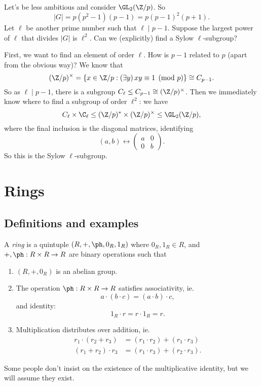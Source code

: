 \documentclass[a4paper]{article}
\begin{document}
\begin{eg}
  Let's be less ambitious and consider $\GL_2(\Z/p)$. So
  \[
    |G| = p(p^2 - 1)(p - 1) = p(p - 1)^2 (p + 1).
  \]
  Let $\ell$ be another prime number such that $\ell \mid p - 1$. Suppose the largest power of $\ell$ that divides $|G|$ is $\ell^2$. Can we (explicitly) find a Sylow $\ell$-subgroup?

  First, we want to find an element of order $\ell$. How is $p - 1$ related to $p$ (apart from the obvious way)? We know that
  \[
    (\Z/p)^\times = \{x \in \Z/p:(\exists y)\, xy \equiv 1 \pmod p\} \cong C_{p - 1}.
  \]
  So as $\ell\mid p - 1$, there is a subgroup $C_\ell \leq C_{p - 1} \cong (\Z/p)^\times$. Then we immediately know where to find a subgroup of order $\ell^2$: we have
  \[
    C_\ell \times \C_\ell \leq (\Z/p)^* \times (\Z/p)^\times \leq \GL_2(\Z/p),
  \]
  where the final inclusion is the diagonal matrices, identifying
  \[
    (a, b) \leftrightarrow
    \begin{pmatrix}
      a & 0\\
      0 & b
    \end{pmatrix}.
  \]
  So this is the Sylow $\ell$-subgroup.
\end{eg}

\section{Rings}
\subsection{Definitions and examples}
\begin{defi}[Ring]
  A \emph{ring} is a quintuple $(R, +, \ph, 0_R, 1_R)$ where $0_R, 1_R \in R$, and $+, \ph: R \times R \to R$ are binary operations such that
  \begin{enumerate}
    \item $(R, +, 0_R)$ is an abelian group.
    \item The operation $\ph: R \times R \to R$ satisfies associativity, ie.
      \[
        a\cdot (b\cdot c) = (a \cdot b)\cdot c,
      \]
      and identity:
      \[
        1_R \cdot r = r \cdot 1_R = r.
      \]
    \item Multiplication distributes over addition, ie.
      \begin{align*}
        r_1 \cdot (r_2 + r_3) &= (r_1 \cdot r_2) + (r_1 \cdot r_3)\\
        (r_1 + r_2) \cdot r_3 &= (r_1 \cdot r_3) + (r_2 \cdot r_3).
      \end{align*}
  \end{enumerate}
\end{defi}
Some people don't insist on the existence of the multiplicative identity, but we will assume they exist.
\end{document}
